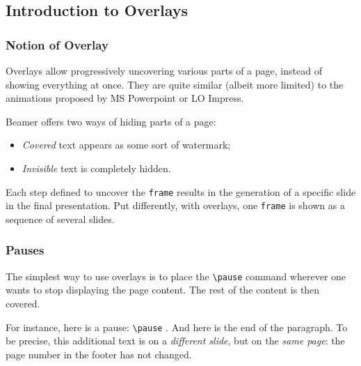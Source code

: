\documentclass[10pt,    %
    english,            %
    xcolor=table,       %
    envcountsect,       %
    aspectratio=43      %
]{beamer}
\begin{document}
\subsection{Introduction to Overlays}
\begin{frame}
    \frametitle{Notion of Overlay}
    
    Overlays allow progressively uncovering various parts of a page, instead of showing everything at once. They are quite similar (albeit more limited) to the animations proposed by MS Powerpoint or LO Impress.
    
    \medskip
    Beamer offers two ways of hiding parts of a page: 
    \begin{itemize}
        \item \textit{Covered} text appears as some sort of watermark;
        \item \textit{Invisible} text is completely hidden.
    \end{itemize}
    
    \medskip
    Each step defined to uncover the \texttt{frame} results in the generation of a specific slide in the final presentation. Put differently, with overlays, one \texttt{frame} is shown as a sequence of several slides.
    
\end{frame}

\begin{frame}
    \frametitle{Pauses}
    
    The simplest way to use overlays is to place the \texttt{\textbackslash{}pause} command wherever one wants to stop displaying the page content. The rest of the content is then covered.
    
    \medskip
    For instance, here is a pause: \texttt{\textbackslash{}pause} \pause. And here is the end of the paragraph. To be precise, this additional text is on a \textit{different slide}, but on the \textit{same page}: the page number in the footer has not changed.
    
    \medskip
\end{frame}
\end{document}
